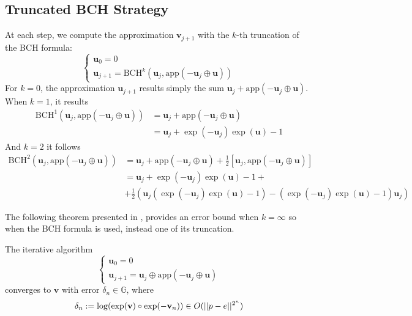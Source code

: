 \subsection{Truncated BCH Strategy}
At each step, we compute the approximation $\mathbf{v}_{j+1}$ with the $k$-th truncation of the BCH formula:
\begin{equation}\label{eq:bossa_bch_strat}
\begin{cases}
\mathbf{u}_0 = 0 \\
\mathbf{u}_{j+1} = \text{BCH}^{k}(\mathbf{u}_{j}, \text{app}(-\mathbf{u}_{j}  \oplus  \mathbf{u} ))
\end{cases}
\end{equation}
For $k = 0$, the approximation $\mathbf{u}_{j+1}$ results simply the sum $\mathbf{u}_{j} + \text{app}(-\mathbf{u}_{j}  \oplus  \mathbf{u} )$. When $k=1$, it results 
\begin{align*}
\text{BCH}^{1}(\mathbf{u}_{j}, \text{app}(-\mathbf{u}_{j}  \oplus  \mathbf{u} ))
&=
\mathbf{u}_{j} +  \text{app}(-\mathbf{u}_{j}  \oplus  \mathbf{u} )\\
&=
\mathbf{u}_{j} + \exp(-\mathbf{u}_{j}) \exp( \mathbf{u})  - 1
\end{align*}
And $k=2$ it follows
\begin{align*}
\text{BCH}^{2}(\mathbf{u}_{j}, \text{app}(-\mathbf{u}_{j}  \oplus  \mathbf{u} ))
&=
\mathbf{u}_{j} +  \text{app}(-\mathbf{u}_{j}  \oplus  \mathbf{u} ) + \frac{1}{2}[\mathbf{u}_{j},  \text{app}(-\mathbf{u}_{j}  \oplus  \mathbf{u} )]\\
&=
\mathbf{u}_{j} + \exp(-\mathbf{u}_{j}) \exp( \mathbf{u})  - 1 + \\
&+ \frac{1}{2}(  \mathbf{u}_{j}( \exp(-\mathbf{u}_{j}) \exp( \mathbf{u})  - 1) -  ( \exp(-\mathbf{u}_{j}) \exp( \mathbf{u})  - 1)\mathbf{u}_{j})
\end{align*}

The following theorem presented in \cite{Bossa:08}, provides an error bound when $k = \infty$ so when the BCH formula is used, instead one of its truncation.
\begin{theorem}[Bossa]\label{th:bossa}
	The iterative algorithm 
	\begin{equation}
	\begin{cases}
	\mathbf{u}_0 = 0 \\
	\mathbf{u}_{j+1} %
	                          = \mathbf{u}_{j} \oplus  \text{app}(-\mathbf{u}_{j}  \oplus  \mathbf{u} )
	\end{cases}
	\end{equation}
	converges to $\mathbf{v}$ with error $\delta_n \in \mathbb{G}$, where
	\begin{align*}
	\delta_{n} := \log(\exp(\mathbf{v})\circ \exp(-\mathbf{v}_{n})) \in O(\vert\lvert p - e \rvert\vert^{2^{n}})
	\end{align*}
\end{theorem}

